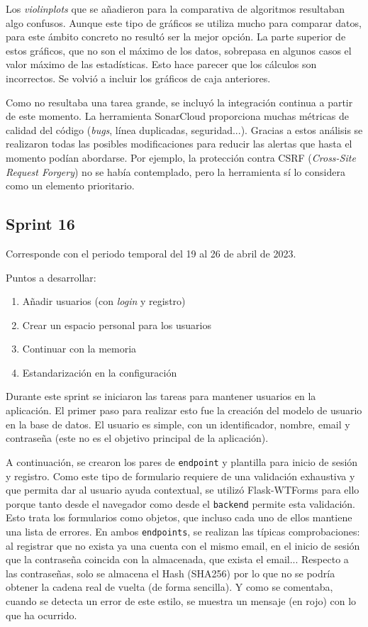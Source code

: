 Los \textit{violinplots} que se añadieron para la comparativa de algoritmos
resultaban algo confusos. Aunque este tipo de gráficos se utiliza mucho para
comparar datos, para este ámbito concreto no resultó ser la mejor opción. La
parte superior de estos gráficos, que no son el máximo de los datos, sobrepasa
en algunos casos el valor máximo de las estadísticas. Esto hace parecer que los
cálculos son incorrectos. Se volvió a incluir los gráficos de caja anteriores.

Como no resultaba una tarea grande, se incluyó la integración continua a partir
de este momento. La herramienta SonarCloud proporciona muchas métricas de
calidad del código (\textit{bugs}, línea duplicadas, seguridad...). Gracias a
estos análisis se realizaron todas las posibles modificaciones para reducir las
alertas que hasta el momento podían abordarse. Por ejemplo, la protección contra
CSRF (\textit{Cross-Site Request Forgery}) no se había contemplado, pero la
herramienta sí lo considera como un elemento prioritario.

\subsection{Sprint 16}
Corresponde con el periodo temporal del 19 al 26 de abril de 2023.

Puntos a desarrollar:
\begin{enumerate}
    \item Añadir usuarios (con \textit{login} y registro)
    \item Crear un espacio personal para los usuarios
    \item Continuar con la memoria
    \item Estandarización en la configuración
\end{enumerate}

Durante este sprint se iniciaron las tareas para mantener usuarios en la
aplicación. El primer paso para realizar esto fue la creación del modelo de
usuario en la base de datos. El usuario es simple, con un identificador, nombre,
email y contraseña (este no es el objetivo principal de la aplicación).

A continuación, se crearon los pares de \texttt{endpoint} y plantilla para
inicio de sesión y registro. Como este tipo de formulario requiere de una
validación exhaustiva y que permita dar al usuario ayuda contextual, se utilizó
Flask-WTForms para ello porque tanto desde el navegador como desde el
\texttt{backend} permite esta validación. Esto trata los formularios como
objetos, que incluso cada uno de ellos mantiene una lista de errores. En ambos
\texttt{endpoints}, se realizan las típicas comprobaciones: al registrar que no
exista ya una cuenta con el mismo email, en el inicio de sesión que la
contraseña coincida con la almacenada, que exista el email... Respecto a las
contraseñas, solo se almacena el Hash (SHA256) por lo que no se podría obtener
la cadena real de vuelta (de forma sencilla). Y como se comentaba, cuando se
detecta un error de este estilo, se muestra un mensaje (en rojo) con lo que ha
ocurrido.

